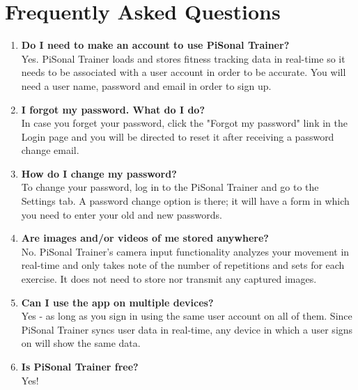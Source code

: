 \documentclass{article}
\begin{document}
\section{Frequently Asked Questions}
\begin{enumerate}
    \item \textbf{Do I need to make an account to use PiSonal Trainer?} \\
    Yes. PiSonal Trainer loads and stores fitness tracking data in real-time so it needs to be associated with a user account in order to be accurate. You will need a user name, password and email in order to sign up.
    
    \item \textbf{I forgot my password. What do I do?} \\
    In case you forget your password, click the "Forgot my password" link in the Login page and you will be directed to reset it after receiving a password change email.
    
    \item \textbf{How do I change my password?} \\
    To change your password, log in to the PiSonal Trainer and go to the Settings tab. A password change option is there; it will have a form in which you need to enter your old and new passwords.
    
    \item \textbf{Are images and/or videos of me stored anywhere?} \\
    No. PiSonal Trainer's camera input functionality analyzes your movement in real-time and only takes note of the number of repetitions and sets for each exercise. It does not need to store nor transmit any captured images.
    
    \item \textbf{Can I use the app on multiple devices?} \\
    Yes - as long as you sign in using the same user account on all of them. Since PiSonal Trainer syncs user data in real-time, any device in which a user signs on will show the same data.
    
    \item \textbf{Is PiSonal Trainer free?} \\
    Yes!
\end{enumerate}
\end{document}
